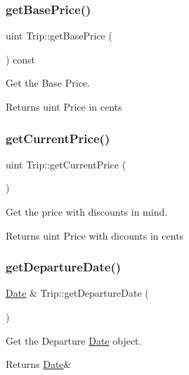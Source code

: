 \subsubsection{\texorpdfstring{get\+Base\+Price()}{getBasePrice()}}
{\footnotesize\ttfamily uint Trip\+::get\+Base\+Price (\begin{DoxyParamCaption}{ }\end{DoxyParamCaption}) const}



Get the Base Price. 

\begin{DoxyReturn}{Returns}
uint Price in cents 
\end{DoxyReturn}
\mbox{\label{classTrip_a9006732aa32a2b098538d48b63f2d276}} 
\subsubsection{\texorpdfstring{get\+Current\+Price()}{getCurrentPrice()}}
{\footnotesize\ttfamily uint Trip\+::get\+Current\+Price (\begin{DoxyParamCaption}{ }\end{DoxyParamCaption})}



Get the price with discounts in mind. 

\begin{DoxyReturn}{Returns}
uint Price with dicounts in cents 
\end{DoxyReturn}
\mbox{\label{classTrip_ae7c3b34b692a17737a2b1200060fa479}} 
\subsubsection{\texorpdfstring{get\+Departure\+Date()}{getDepartureDate()}}
{\footnotesize\ttfamily \mbox{\hyperlink{classDate}{Date}} \& Trip\+::get\+Departure\+Date (\begin{DoxyParamCaption}{ }\end{DoxyParamCaption})}



Get the Departure \mbox{\hyperlink{classDate}{Date}} object. 

\begin{DoxyReturn}{Returns}
\mbox{\hyperlink{classDate}{Date}}\& 
\end{DoxyReturn}
\mbox{\label{classTrip_a459ae85fc25404ba616fabfb4b4165f4}} 
